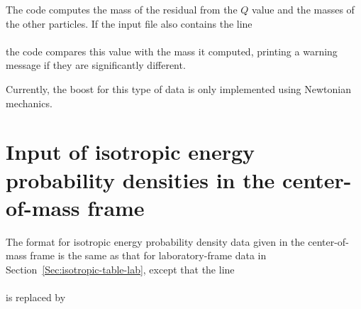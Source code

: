 The code computes the mass of the residual from the $Q$ value and
the masses of the other particles.  If the input file also contains the line\\
 \\
the code compares this value with the mass it computed, printing
a warning message if they are significantly different.

Currently, the boost for this type of data is only implemented using Newtonian mechanics.

\section{Input of isotropic energy probability
densities in the center-of-mass frame}
\label{Sec:isotropic-table-cm}

The format for isotropic energy probability
density data given in the center-of-mass frame is the
same as that for laboratory-frame data in
Section~\ref{Sec:isotropic-table-lab}, except that
the line\\
  \\
is replaced by\\
